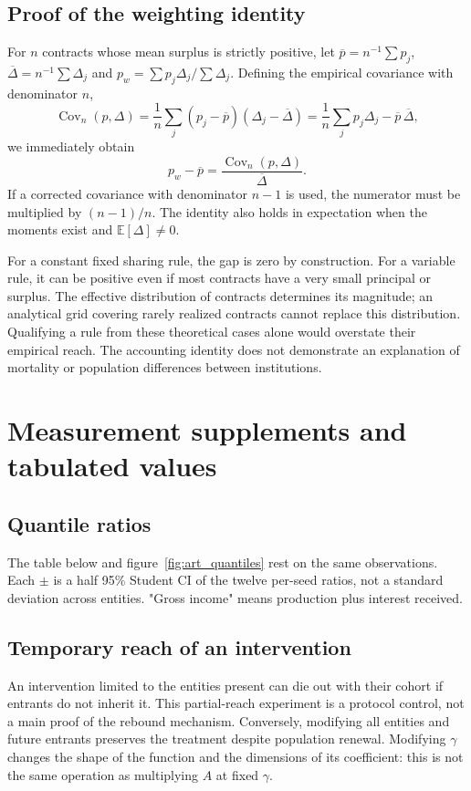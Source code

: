 \subsection{Proof of the weighting identity}\label{sec:ponderation}
For $n$ contracts whose mean surplus is strictly positive,
let $\overline p=n^{-1}\sum p_j$,
$\overline\Delta=n^{-1}\sum\Delta_j$ and
$p_w=\sum p_j\Delta_j/\sum\Delta_j$.
Defining the empirical covariance with denominator $n$,
\[
 \operatorname{Cov}_n(p,\Delta)
 =\frac1n\sum_j(p_j-\overline p)(\Delta_j-\overline\Delta)
 =\frac1n\sum_jp_j\Delta_j-\overline p\,\overline\Delta,
\]
we immediately obtain
\begin{equation}
 p_w-\overline p=\frac{\operatorname{Cov}_n(p,\Delta)}{\overline\Delta}.
 \label{eq:identite}
\end{equation}
If a corrected covariance with denominator $n-1$ is used,
the numerator must be multiplied by $(n-1)/n$. The identity also
holds in expectation when the moments exist and
$\mathbb E[\Delta]\ne0$.

For a constant fixed sharing rule, the gap is zero by construction.
For a variable rule, it can be positive even if most
contracts have a very small principal or surplus. The
effective distribution of contracts determines its magnitude; an
analytical grid covering rarely realized contracts cannot
replace this distribution. Qualifying a rule from
these theoretical cases alone would overstate their empirical reach.
The accounting identity does not demonstrate an explanation of
mortality or population differences between institutions.

\section{Measurement supplements and tabulated values}\label{sec:tableaux}
\subsection{Quantile ratios}
The table below and figure~\ref{fig:art_quantiles} rest
on the same observations. Each $\pm$ is a half 95\% Student CI
of the twelve per-seed ratios, not a standard deviation across
entities. "Gross income" means production plus interest received.
\begin{small}\end{small}

\subsection{Temporary reach of an intervention}
An intervention limited to the entities present can die out
with their cohort if entrants do not inherit it. This
partial-reach experiment is a protocol control,
not a main proof of the rebound mechanism. Conversely,
modifying all entities and future entrants preserves
the treatment despite population renewal. Modifying
$\gamma$ changes the shape of the function and the dimensions of
its coefficient: this is not the same operation as multiplying
$A$ at fixed $\gamma$.

